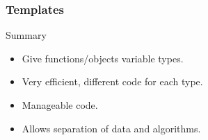 \begin{frame}[fragile]
  \frametitle{Templates}
  \begin{block}{Summary}
    \begin{itemize}
    \item Give functions/objects variable types.
    \item Very efficient, different code for each type.
    \item Manageable code.
    \item Allows separation of data and algorithms.
    \end{itemize}
  \end{block}
\end{frame}
